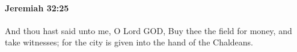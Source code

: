 
		\paragraph{Jeremiah 32:25} %
			\label{JEREMIAH-32-25}

			And thou hast said unto me, O Lord GOD, Buy thee the field for money, and take witnesses; for the city is given into the hand of the Chaldeans.


